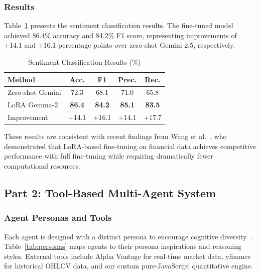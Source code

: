 \documentclass[conference]{IEEEtran}
\begin{document}
\subsubsection{Results}

Table~\ref{tab:lora_results} presents the sentiment classification results. The fine-tuned model achieved 86.4\% accuracy and 84.2\% F1 score, representing improvements of +14.1 and +16.1 percentage points over zero-shot Gemini 2.5, respectively.

\begin{table}[htbp]
\caption{Sentiment Classification Results (\%)}
\label{tab:lora_results}
\centering
\small
\begin{tabular}{@{}lcccc@{}}
\toprule
\textbf{Method} & \textbf{Acc.} & \textbf{F1} & \textbf{Prec.} & \textbf{Rec.} \\
\midrule
Zero-shot Gemini & 72.3 & 68.1 & 71.0 & 65.8 \\
LoRA Gemma-2 & \textbf{86.4} & \textbf{84.2} & \textbf{85.1} & \textbf{83.5} \\
\midrule
Improvement & +14.1 & +16.1 & +14.1 & +17.7 \\
\bottomrule
\end{tabular}
\end{table}

These results are consistent with recent findings from Wang et al.~\cite{wang2024finlora}, who demonstrated that LoRA-based fine-tuning on financial data achieves competitive performance with full fine-tuning while requiring dramatically fewer computational resources.

\subsection{Part 2: Tool-Based Multi-Agent System}

\subsubsection{Agent Personas and Tools}

Each agent is designed with a distinct persona to encourage cognitive diversity~\cite{du2023debate}. Table~\ref{tab:personas} maps agents to their persona inspirations and reasoning styles. External tools include Alpha Vantage for real-time market data, yfinance for historical OHLCV data, and our custom pure-JavaScript quantitative engine.
\end{document}
